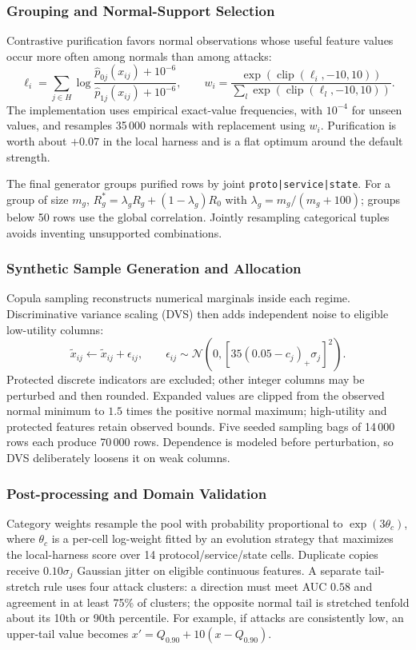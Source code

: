 \documentclass[10pt,a4paper]{article}
\begin{document}
\subsubsection{Grouping and Normal-Support Selection}
Contrastive purification favors normal observations whose useful feature values occur more often among normals than among attacks:
\begin{equation}
\ell_i=\sum_{j\in H}\log\frac{\widehat p_{0j}(x_{ij})+10^{-6}}{\widehat p_{1j}(x_{ij})+10^{-6}},\qquad
w_i=\frac{\exp(\operatorname{clip}(\ell_i,-10,10))}{\sum_l\exp(\operatorname{clip}(\ell_l,-10,10))}.
\end{equation}
The implementation uses empirical exact-value frequencies, with $10^{-4}$ for unseen values, and resamples 35\,000 normals with replacement using $w_i$. Purification is worth about $+0.07$ in the local harness and is a flat optimum around the default strength.

The final generator groups purified rows by joint \texttt{proto|service|state}. For a group of size $m_g$, $R_g^*=\lambda_gR_g+(1-\lambda_g)R_0$ with $\lambda_g=m_g/(m_g+100)$; groups below 50 rows use the global correlation. Jointly resampling categorical tuples avoids inventing unsupported combinations.
\subsubsection{Synthetic Sample Generation and Allocation}
Copula sampling reconstructs numerical marginals inside each regime. Discriminative variance scaling (DVS) then adds independent noise to eligible low-utility columns:
\begin{equation}
\widetilde x_{ij}\leftarrow\widetilde x_{ij}+\epsilon_{ij},\qquad
\epsilon_{ij}\sim\mathcal N\!\left(0,[35(0.05-c_j)_+\sigma_j]^2\right).
\end{equation}
Protected discrete indicators are excluded; other integer columns may be perturbed and then rounded. Expanded values are clipped from the observed normal minimum to $1.5$ times the positive normal maximum; high-utility and protected features retain observed bounds. Five seeded sampling bags of 14\,000 rows each produce 70\,000 rows. Dependence is modeled before perturbation, so DVS deliberately loosens it on weak columns.
\subsubsection{Post-processing and Domain Validation}
Category weights resample the pool with probability proportional to $\exp(3\theta_c)$, where $\theta_c$ is a per-cell log-weight fitted by an evolution strategy that maximizes the local-harness score over 14 protocol/service/state cells. Duplicate copies receive $0.10\sigma_j$ Gaussian jitter on eligible continuous features. A separate tail-stretch rule uses four attack clusters: a direction must meet AUC $0.58$ and agreement in at least 75\% of clusters; the opposite normal tail is stretched tenfold about its 10th or 90th percentile. For example, if attacks are consistently low, an upper-tail value becomes $x'=Q_{0.90}+10(x-Q_{0.90})$.
\end{document}
